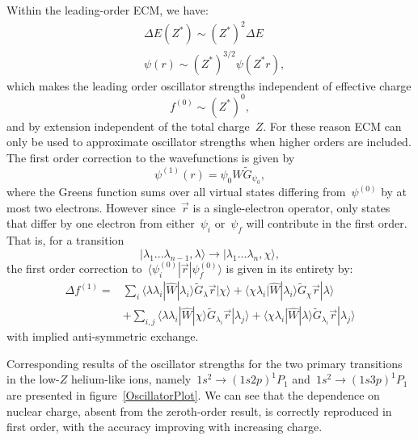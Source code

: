 Within the leading-order ECM, we have:
\begin{align}
    &\Delta E (Z^*) \sim (Z^*)^2 \Delta E\\
    &\psi(r) \sim (Z^*)^{3/2}\psi(Z^* r),
\end{align}
which makes the leading order oscillator strengths independent of effective charge
\begin{equation}
    f^{(0)} \sim (Z^*)^0,
\end{equation}
and by extension independent of the total charge~$Z$. For these reason ECM can only be used to approximate oscillator strengths when higher orders are included. The first order correction to the wavefunctions is given by
\begin{equation}
    \psi^{(1)}(r) = \psi_0 W \widetilde{G}_{\psi_0},
\end{equation}
where the Greens function sums over all virtual states differing from~$\psi^{(0)}$ by at most two electrons. However since~$\vec{r}$ is a single-electron operator, only states that differ by one electron from either~$\psi_i$ or~$\psi_f$ will contribute in the first order. That is, for a transition
\begin{equation}
    |\lambda_1 ... \lambda_{n-1}, \lambda \rangle \rightarrow |\lambda_1 ... \lambda_n,\chi \rangle,
\end{equation}
the first order correction to~$\langle \psi_i^{(0)}|\vec{r}|\psi_f^{(0)} \rangle$ is given in its entirety by:
\begin{align}
   \Delta f^{(1)} =& \sum_i \langle \lambda \lambda_i|\widehat{W}|\lambda_i \rangle \widetilde{G}_{\lambda} \vec{r} | \chi \rangle +\langle \chi \lambda_i|\widehat{W}|\lambda_i \rangle \widetilde{G}_{\chi} \vec{r} | \lambda \rangle \nonumber
   \\
   &+ \sum_{i,j} \langle \lambda \lambda_i|\widehat{W}|\chi \rangle \widetilde{G}_{\lambda_i} \vec{r} | \lambda_j \rangle  + \langle \chi \lambda_i|\widehat{W}|\lambda \rangle \widetilde{G}_{\lambda_i} \vec{r} | \lambda_j \rangle 
\end{align}
with implied anti-symmetric exchange.

Corresponding results of the oscillator strengths for the two primary transitions in the low-$Z$ helium-like ions, namely~$1s^2 \rightarrow (1s2p)^1P_1$ and~$1s^2 \rightarrow (1s3p)^1P_1$ are presented in figure~\ref{OscillatorPlot}. We can see that the dependence on nuclear charge, absent from the zeroth-order result, is correctly reproduced in first order, with the accuracy improving with increasing charge.

